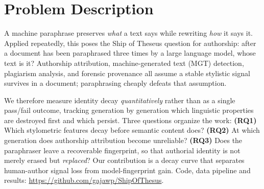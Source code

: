 \section{Problem Description}

A machine paraphrase preserves \emph{what} a text says while rewriting \emph{how} it says it.
Applied repeatedly, this poses the Ship of Theseus question for authorship: after a document
has been paraphrased three times by a large language model, whose text is it?
Authorship attribution, machine-generated text (MGT) detection, plagiarism analysis, and
forensic provenance all assume a stable stylistic signal survives in a document; paraphrasing
cheaply defeats that assumption.

We therefore measure identity decay \emph{quantitatively} rather than as a single pass/fail
outcome, tracking generation by generation which linguistic properties are destroyed first and
which persist. Three questions organize the work:
\textbf{(RQ1)} Which stylometric features decay before semantic content does?
\textbf{(RQ2)} At which generation does authorship attribution become unreliable?
\textbf{(RQ3)} Does the paraphraser leave a recoverable fingerprint, so that authorial identity
is not merely erased but \emph{replaced}?
Our contribution is a decay curve that separates human-author signal loss from model-fingerprint gain.
Code, data pipeline and results: \url{https://github.com/gajawp/ShipOfThesus}.
